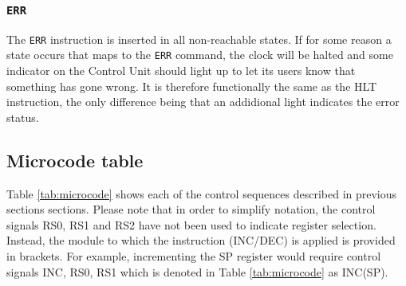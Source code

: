 \subsubsection{\texttt{ERR}}
The \texttt{ERR} instruction is inserted in all non-reachable states. If for some reason a state occurs that maps to the \texttt{ERR} command, the clock will be halted and some indicator on the Control Unit should light up to let its users know that something has gone wrong. It is therefore functionally the same as the HLT instruction, the only difference being that an addidional light indicates the error status.

\subsection{Microcode table}
Table \ref{tab:microcode} shows each of the control sequences described in previous sections sections. Please note that in order to simplify notation, the control signals RS0, RS1 and RS2 have not been used to indicate register selection. Instead, the module to which the instruction (INC/DEC) is applied is provided in brackets. For example, incrementing the SP register would require control signals INC, RS0, RS1 which is denoted in Table \ref{tab:microcode} as INC(SP).
\newpage





